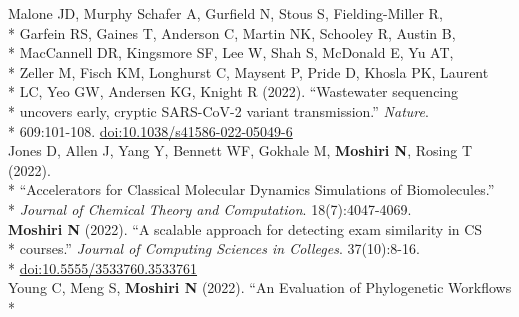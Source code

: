 \documentclass[margin,line]{res}
\begin{document}
\begin{resume}
\hspace*{9.5mm} Malone JD, Murphy Schafer A, Gurfield N, Stous S, Fielding-Miller R,\\*
\hspace*{9.5mm} Garfein RS, Gaines T, Anderson C, Martin NK, Schooley R, Austin B,\\*
\hspace*{9.5mm} MacCannell DR, Kingsmore SF, Lee W, Shah S, McDonald E, Yu AT,\\*
\hspace*{9.5mm} Zeller M, Fisch KM, Longhurst C, Maysent P, Pride D, Khosla PK, Laurent\\*
\hspace*{9.5mm} LC, Yeo GW, Andersen KG, Knight R (2022). ``Wastewater sequencing\\*
\hspace*{9.5mm} uncovers early, cryptic SARS-CoV-2 variant transmission.'' \textit{Nature}.\\*\vspace{2mm}
\hspace*{8mm} 609:101-108. \href{https://doi.org/10.1038/s41586-022-05049-6}{doi:10.1038/s41586-022-05049-6}\\
\hspace*{4mm} Jones D, Allen J, Yang Y, Bennett WF, Gokhale M, \textbf{Moshiri N}, Rosing T (2022).\\*
\hspace*{9.5mm} ``Accelerators for Classical Molecular Dynamics Simulations of Biomolecules.''\\*\vspace{2mm}
\hspace*{8mm} \textit{Journal of Chemical Theory and Computation}. 18(7):4047-4069.\\
\hspace*{4mm} \textbf{Moshiri N} (2022). ``A scalable approach for detecting exam similarity in CS\\*
\hspace*{9.5mm} courses.'' \textit{Journal of Computing Sciences in Colleges}. 37(10):8-16.\\*\vspace{2mm}
\hspace*{8mm} \href{https://dl.acm.org/doi/abs/10.5555/3533760.3533761}{doi:10.5555/3533760.3533761}\\
\hspace*{4mm} Young C, Meng S, \textbf{Moshiri N} (2022). ``An Evaluation of Phylogenetic Workflows\\*\vspace{2mm}

\end{resume}
\end{document}
